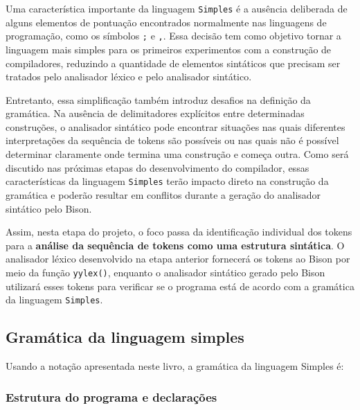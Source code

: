 \documentclass[
  brazilian,
  letterpaper,
]{book}
\theoremstyle{plain}
\theoremstyle{definition}
\theoremstyle{remark}
\begin{document}
Uma característica importante da linguagem \texttt{Simples} é a ausência
deliberada de alguns elementos de pontuação encontrados normalmente nas
linguagens de programação, como os símbolos \texttt{;} e \texttt{,}.
Essa decisão tem como objetivo tornar a linguagem mais simples para os
primeiros experimentos com a construção de compiladores, reduzindo a
quantidade de elementos sintáticos que precisam ser tratados pelo
analisador léxico e pelo analisador sintático.

Entretanto, essa simplificação também introduz desafios na definição da
gramática. Na ausência de delimitadores explícitos entre determinadas
construções, o analisador sintático pode encontrar situações nas quais
diferentes interpretações da sequência de tokens são possíveis ou nas
quais não é possível determinar claramente onde termina uma construção e
começa outra. Como será discutido nas próximas etapas do desenvolvimento
do compilador, essas características da linguagem \texttt{Simples} terão
impacto direto na construção da gramática e poderão resultar em
conflitos durante a geração do analisador sintático pelo Bison.

Assim, nesta etapa do projeto, o foco passa da identificação individual
dos tokens para a \textbf{análise da sequência de tokens como uma
estrutura sintática}. O analisador léxico desenvolvido na etapa anterior
fornecerá os tokens ao Bison por meio da função \texttt{yylex()},
enquanto o analisador sintático gerado pelo Bison utilizará esses tokens
para verificar se o programa está de acordo com a gramática da linguagem
\texttt{Simples}.

\subsection{Gramática da linguagem
simples}\label{gramuxe1tica-da-linguagem-simples}

Usando a notação apresentada neste livro, a gramática da linguagem
Simples é:

\subsubsection{Estrutura do programa e
declarações}\label{estrutura-do-programa-e-declarauxe7uxf5es}
\end{document}
